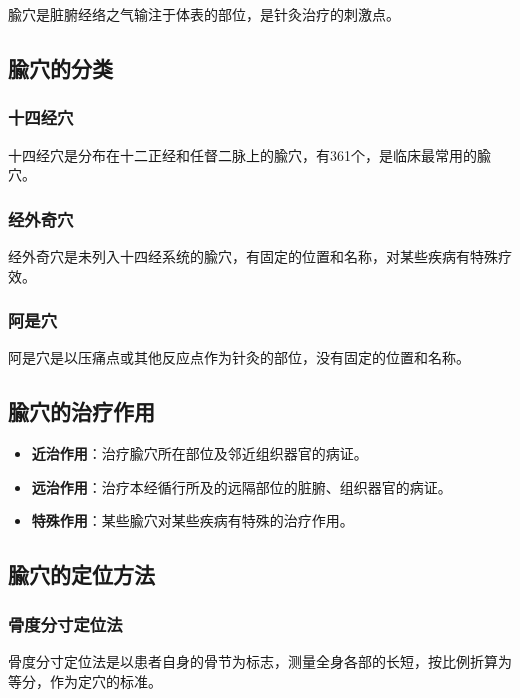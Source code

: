 \documentclass[12pt,UTF8]{ctexbook}
\begin{document}
腧穴是脏腑经络之气输注于体表的部位，是针灸治疗的刺激点。

\subsection{腧穴的分类}

\subsubsection{十四经穴}

十四经穴是分布在十二正经和任督二脉上的腧穴，有361个，是临床最常用的腧穴。

\subsubsection{经外奇穴}

经外奇穴是未列入十四经系统的腧穴，有固定的位置和名称，对某些疾病有特殊疗效。

\subsubsection{阿是穴}

阿是穴是以压痛点或其他反应点作为针灸的部位，没有固定的位置和名称。

\subsection{腧穴的治疗作用}

\begin{itemize}
\item \textbf{近治作用}：治疗腧穴所在部位及邻近组织器官的病证。
\item \textbf{远治作用}：治疗本经循行所及的远隔部位的脏腑、组织器官的病证。
\item \textbf{特殊作用}：某些腧穴对某些疾病有特殊的治疗作用。
\end{itemize}

\subsection{腧穴的定位方法}

\subsubsection{骨度分寸定位法}

骨度分寸定位法是以患者自身的骨节为标志，测量全身各部的长短，按比例折算为等分，作为定穴的标准。
\end{document}
